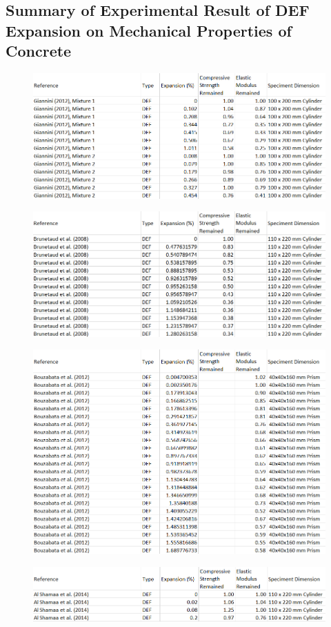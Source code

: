 \clearpage
\subsection{Summary of Experimental Result of DEF Expansion on Mechanical Properties of Concrete}

\begin{figure}[h!]
  \centering
  \includegraphics[width=1.0\linewidth]{Reference/GIANNINIDEFdata.png}
\end{figure}

\begin{figure}[h!]
  \centering
  \includegraphics[width=1.0\linewidth]{Reference/BruetaudDEFdata.png}
\end{figure}

\begin{figure}[h!]
  \centering
  \includegraphics[width=1.0\linewidth]{Reference/BouzabataDEFdata.png}
\end{figure}

\begin{figure}[h!]
  \centering
  \includegraphics[width=1.0\linewidth]{Reference/ShamaaDEFdata.png}
\end{figure}
